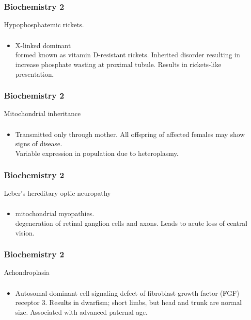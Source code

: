 \documentclass[11pt]{beamer}
\begin{document}
\begin{frame}
 \frametitle{Biochemistry 2}
Hypophosphatemic rickets.
\end{frame}

\begin{frame}
 \frametitle{}
\begin{itemize}
\item X-linked dominant \\ formed known as vitamin D-resistant rickets. Inherited disorder resulting in increase phosphate wasting at proximal tubule. Results in rickets-like presentation. 
\end{itemize}
\end{frame}

\begin{frame}
 \frametitle{Biochemistry 2}
Mitochondrial inheritance
\end{frame}

\begin{frame}
 \frametitle{}
\begin{itemize}
\item Transmitted only through mother. All offspring of affected females may show signs of disease. \\ Variable expression in population due to heteroplasmy.
\end{itemize}
\end{frame}

\begin{frame}
 \frametitle{Biochemistry 2}
Leber’s hereditary optic neuropathy
\end{frame}

\begin{frame}
 \frametitle{}
\begin{itemize}
\item mitochondrial myopathies. \\ degeneration of retinal ganglion cells and axons. Leads to acute loss of central vision. 
\end{itemize}
\end{frame}

\begin{frame}
 \frametitle{Biochemistry 2}
Achondroplasia
\end{frame}

\begin{frame}
 \frametitle{}
\begin{itemize}
\item Autosomal-dominant cell-signaling defect of fibroblast growth factor (FGF) receptor 3. Results in dwarfism; short limbs, but head and trunk are normal size. Associated with advanced paternal age.
\end{itemize}
\end{frame}
\end{document}
